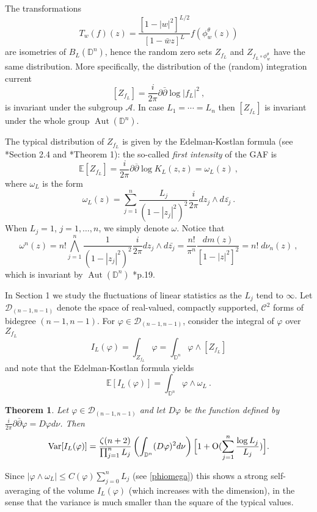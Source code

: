 \documentclass[12pt,twoside,final,amsfonts]{amsart}
\theoremstyle{plain}
\newtheorem{theorem}{Theorem}
\theoremstyle{definition}
\theoremstyle{definition}
\begin{document}
The transformations
\[
 T_w(f)(z)=\frac{[1-|w|^2]^{L/2}}{[1-\bar w z]^L} f(\phi_w^\theta(z))
\]
are isometries of $B_L({\mathbb{D}}^n)$, hence the random zero sets $Z_{f_L}$ and $Z_{f_L\circ\phi_w^\theta}$ have the same distribution. More specifically, the distribution of the (random) integration current
\[
 [Z_{f_L}]=\frac {i}{2\pi}\partial\bar\partial\log |f_L|^2\ ,
\]
is invariant under the subgroup $\mathcal A$. In case $L_1=\cdots=L_n$ then $[Z_{f_L}]$ is invariant under the whole group ${\operatorname{Aut}}({\mathbb{D}}^n)$.

The typical distribution of $Z_{f_L}$ is given by the Edelman-Kostlan formula (see \cite{HKPV}*{Section 2.4} and \cite{Sod}*{Theorem 1}): the so-called \emph{first intensity} of the GAF is 
\[
{\mathbb{E}}[Z_{f_L}] =\frac{i}{2\pi}\partial \overline{\partial}\log K_L(z,z)= \omega_L (z)\ ,
\]
where $\omega_L$ is the form
\[
\omega_L(z)=\sum_{j=1}^n \frac{L_j}{(1-|z_j|^2)^2} \frac{i}{2\pi} dz_j\wedge d\bar{z_j}\ .
\]
When $L_j=1$, $j=1,\dots,n$, we simply denote $\omega$. 
Notice that
\[
 \omega^n(z)= n!\bigwedge_{j=1}^n \frac{1}{(1-|z_j|^2)^2} \frac{i}{2\pi} dz_j\wedge d\bar{z_j}=\frac{n!}{\pi^n}\frac{dm(z)}{[1-|z|^2]^2}=n!\;  d\nu_n(z)\ ,
\]
which is invariant by ${\operatorname{Aut}}({\mathbb{D}}^n)$ \cite{Stoll}*{p.19}.

In Section 1 we study the fluctuations of linear statistics as the $L_j$ tend to $\infty$. Let $\mathcal D_{(n-1,n-1)}$ denote the space of real-valued, compactly supported, $\mathcal C^2$ forms of bidegree $(n-1,n-1)$. For  $\varphi\in\mathcal D_{(n-1,n-1)}$, consider the integral of $\varphi$ over $Z_{f_L}$
\[
I_L(\varphi)=\int_{Z_{f_L}}\varphi=\int_{{\mathbb{D}}^n}  \varphi  \wedge [Z_{f_L}]  
\]
and note that the Edelman-Kostlan formula yields
\begin{equation}\label{E}
{\mathbb{E}}[I_{L}(\varphi)]=\int_{{\mathbb{D}}^n}\varphi\wedge \omega_L\ .
\end{equation}

\begin{theorem}\label{LS}
 Let $\varphi\in \mathcal D_{(n-1,n-1)}$ and let $D\varphi$ be the function defined by $\frac i{2\pi}\partial\bar\partial\varphi=D\varphi d\nu$. Then
 \[
  {\operatorname{Var}} [I_L(\varphi)]= \frac{\zeta(n+2)}{\prod_{j=1}^n L_j}\left(\int_{{\mathbb{D}}^n} (D\varphi)^2 d\nu\right)\Bigl[1+\textrm{O}(\sum_{j=1}^n\frac{\log L_j}{L_j})\Bigr].
 \]
\end{theorem}
Since $|\varphi\wedge \omega_L|\leq C(\varphi) \sum_{j=0}^n L_j$ (see \eqref{phiomega})  this shows a strong self-averaging of the volume $I_L(\varphi)$ (which increases with the dimension), in the sense that the variance is much smaller than the square of the typical values.
\end{document}
